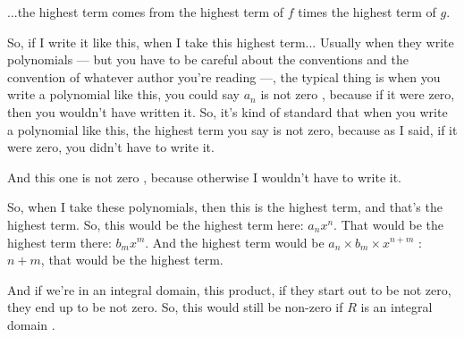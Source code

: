 \begin{speech}[00:22:05 - 00:23:22]
...the highest term comes from the highest term of $f$ times the highest term of $g$.

So, if I write it like this, when I take this highest term... Usually when they write polynomials --- but you have to be careful about the conventions and the convention of whatever author you're reading ---, the typical thing is when you write a polynomial like this, you could say $a_n$ is not zero , because if it were zero, then you wouldn't have written it. So, it's kind of standard that when you write a polynomial like this, the highest term you say is not zero, because as I said, if it were zero, you didn't have to write it.

And this one  is not zero , because otherwise I wouldn't have to write it.

So, when I take these polynomials, then this is the highest term, and that's the highest term. So, this would be the highest term here: $a_n x^n$. That would be the highest term there: $b_m x^m$. And the highest term would be $a_n \times b_m \times x^{n+m}$ : $n + m$, that would be the highest term.

And if we're in an integral domain, this product, if they start out to be not zero, they end up to be not zero. So, this would still be non-zero if $R$ is an integral domain .
\end{speech}


